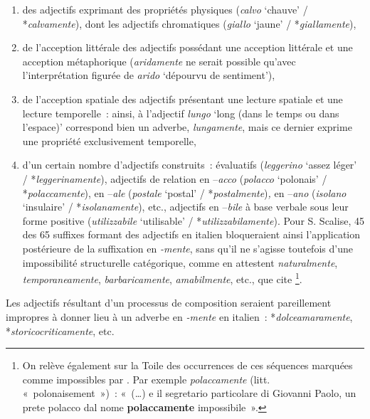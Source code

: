 \documentclass[output=paper]{langsci/langscibook}
\begin{document}
\begin{enumerate}[label=(\alph*)]

\item des adjectifs exprimant des propriétés physiques (\emph{calvo} `chauve' / *\emph{calvamente}), dont les adjectifs chromatiques (\emph{giallo} `jaune' / *\emph{giallamente}),

\item de l'acception littérale des adjectifs possédant une acception littérale et une acception métaphorique (\emph{aridamente} ne serait possible qu'avec l'interprétation figurée de \emph{arido} `dépourvu de sentiment'),

\item de l'acception spatiale des adjectifs présentant une lecture spatiale et une lecture temporelle~: ainsi, à l'adjectif \emph{lungo} `long (dans le temps ou dans l'espace)' correspond bien un adverbe, \emph{lungamente}, mais ce dernier exprime une propriété exclusivement temporelle,

\item d'un certain nombre d'adjectifs construits~: évaluatifs (\emph{leggerino} `assez léger' / *\emph{leggerinamente}), adjectifs de relation en --\emph{acco} (\emph{polacco} `polonais' / *\emph{polaccamente}), en --\emph{ale} (\emph{postale} `postal' / *\emph{postalmente})\emph{,} en --\emph{ano} (\emph{isolano} `insulaire' / *\emph{isolanamente}), etc., adjectifs en --\emph{bile} à base verbale sous leur forme positive (\emph{utilizzabile} `utilisable' / *\emph{utilizzabilamente}). Pour S. Scalise, 45 des 65 suffixes formant des adjectifs en italien bloqueraient ainsi l'application postérieure de la suffixation en \emph{-mente}, sans qu'il ne s'agisse toutefois d'une impossibilité structurelle catégorique, comme en attestent \emph{naturalmente}, \emph{temporaneamente}, \emph{barbaricamente}, \emph{amabilmente}, etc., que cite %
\citet{Scalise90}%
%
\footnote{On relève également sur la Toile des occurrences de ces séquences marquées comme impossibles par %
\citet{Scalise90}%
%
. Par exemple \emph{polaccamente} (litt. «~polonaisement~»)~: «~(\ldots{}) e il segretario particolare di Giovanni Paolo, un prete polacco dal nome \textbf{polaccamente} impossibile~».}.

\end{enumerate}

Les adjectifs résultant d'un processus de composition seraient pareillement impropres à donner lieu à un adverbe en \emph{-mente} en italien~: *\emph{dolceamaramente}, *\emph{storicocriticamente}, etc.
\end{document}
